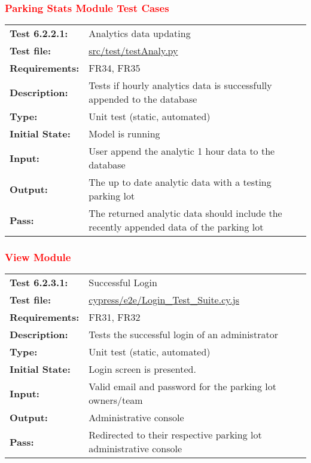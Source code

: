 \documentclass[12pt, titlepage]{article}
\begin{document}
\vspace*{0.5 cm}


\subsubsection{\textcolor{red}{Parking Stats Module Test Cases}}
\textcolor{red}{
\begin{center}
\begin{tabular}{|l|p{10cm}|}
    \hline
    \bf{Test} 6.2.2.1: & Analytics data updating \\
    \bf{Test file: } &
    \href{https://github.com/parkd-app/park-d/blob/main/test/TestAnaly.py}{src/test/testAnaly.py}\\
    \bf{Requirements}: & FR34, FR35 \\
    \bf{Description}: & Tests if hourly analytics data is successfully appended
    to the database\\
    \bf{Type}: & Unit test (static, automated) \\
    \bf{Initial State}: & Model is running \\
    \bf{Input}: & User append the analytic 1 hour data to the database \\
    \bf{Output}: & The up to date analytic data with a testing parking lot \\
    \bf{Pass}: & The returned analytic data should include the recently appended
    data of the parking lot \\
    \hline
\end{tabular}
\end{center}}

\subsubsection{\textcolor{red}{View Module}} \textcolor{red}{
\begin{center}
\begin{tabular}{|l|p{10cm}|}
    \hline
    \bf{Test} 6.2.3.1: & Successful Login \\
    \bf{Test file: } &
    \href{https://github.com/parkd-app/park-d/blob/main/src/park-d-front-end/src/cypress/e2e/Login_Test_Suite.cy.js}{cypress/e2e/Login\_Test\_Suite.cy.js}\\
    \bf{Requirements}: & FR31, FR32\\
    \bf{Description}: & Tests the successful login of an administrator\\
    \bf{Type}: & Unit test (static, automated) \\
    \bf{Initial State}: & Login screen is presented. \\
    \bf{Input}: & Valid email and password for the parking lot owners/team \\
    \bf{Output}: & Administrative console \\
    \bf{Pass}: &  Redirected to their respective parking lot administrative
    console\\
    \hline
\end{tabular}
\end{center}}
\end{document}
